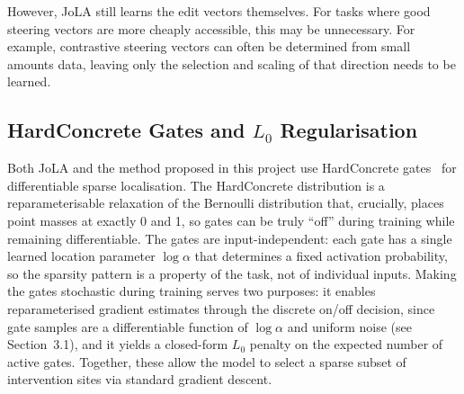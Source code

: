 However, JoLA still learns the edit vectors themselves.
For tasks where good steering vectors are more cheaply accessible, this may be unnecessary. For example, contrastive steering vectors can often be determined from small amounts data, leaving only the selection and scaling of that direction needs to be learned.

\subsection[HardConcrete Gates and L0 Regularisation]{HardConcrete Gates and $L_0$ Regularisation}

Both JoLA and the method proposed in this project use HardConcrete gates~\cite{louizos2018hardconcrete} for differentiable sparse localisation.
The HardConcrete distribution is a reparameterisable relaxation of the Bernoulli distribution that, crucially, places point masses at exactly 0 and 1, so gates can be truly ``off'' during training while remaining differentiable.
The gates are input-independent: each gate has a single learned location parameter $\log\alpha$ that determines a fixed activation probability, so the sparsity pattern is a property of the task, not of individual inputs.
Making the gates stochastic during training serves two purposes: it enables reparameterised gradient estimates through the discrete on/off decision, since gate samples are a differentiable function of $\log\alpha$ and uniform noise (see Section~3.1), and it yields a closed-form $L_0$ penalty on the expected number of active gates.
Together, these allow the model to select a sparse subset of intervention sites via standard gradient descent.
